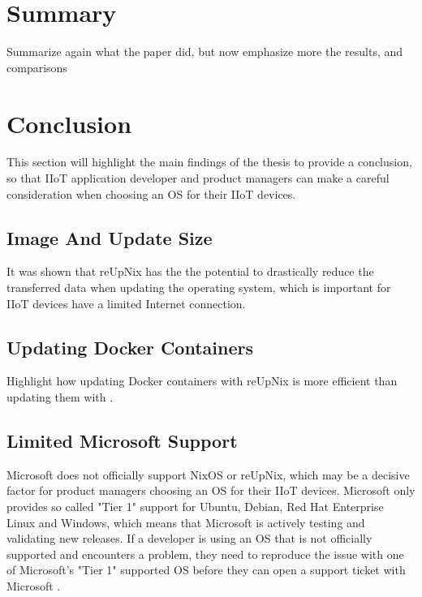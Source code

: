 \section{Summary}
\begin{tcolorbox}[title=TODO]
Summarize again what the paper did, but now emphasize more the results, and comparisons
\end{tcolorbox}

\section{Conclusion}
This section will highlight the main findings of the thesis to provide a
conclusion, so that \ac{IIoT} application developer and product managers can
make a careful consideration when choosing an \ac{OS} for their \ac{IIoT} devices.

\subsection{Image And Update Size}
It was shown that reUpNix has the the potential to drastically reduce the transferred
data when updating the operating system, which is important for \ac{IIoT} devices
have a limited Internet connection.

\subsection{Updating Docker Containers}

\begin{tcolorbox}[title=TODO]
    Highlight how updating Docker containers with reUpNix is more efficient than
    updating them with .
\end{tcolorbox}

\subsection{Limited Microsoft Support}
Microsoft does not officially support NixOS or reUpNix, which may be a decisive factor
for product managers choosing an \ac{OS} for their \ac{IIoT} devices. Microsoft
only provides so called "Tier 1" support for Ubuntu, Debian, Red Hat Enterprise
Linux and Windows, which means that Microsoft is actively testing and validating
new releases. If a developer is using an \ac{OS} that is not officially supported
and encounters a problem, they need to reproduce the issue with one of Microsoft's
"Tier 1" supported \ac{OS} before they can open a support ticket with Microsoft
\cite{msdoc-supportetplatforms}.

